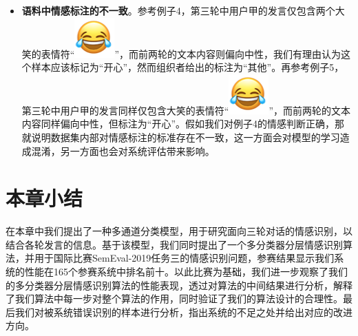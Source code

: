 \begin{itemize}
\item {\bf 语料中情感标注的不一致}。参考例子4，第三轮中用户甲的发言仅包含两个大笑的表情符“\includegraphics[height=1.5\fontcharht\font`\B]{img/emoji/lol.png}”，而前两轮的文本内容则偏向中性，我们有理由认为这个样本应该标记为“开心”，然而组织者给出的标注为“其他”。再参考例子5，第三轮中用户甲的发言同样仅包含大笑的表情符“\includegraphics[height=1.5\fontcharht\font`\B]{img/emoji/lol.png}”，而前两轮的文本内容同样偏向中性，但标注为“开心”。假如我们对例子4的情感判断正确，那就说明数据集内部对情感标注的标准存在不一致，这一方面会对模型的学习造成混淆，另一方面也会对系统评估带来影响。

\end{itemize}

\section{本章小结}

在本章中我们提出了一种多通道分类模型，用于研究面向三轮对话的情感识别，以结合各轮发言的信息。基于该模型，我们同时提出了一个多分类器分层情感识别算法，并用于国际比赛SemEval-2019任务三的情感识别问题，参赛结果显示我们系统的性能在165个参赛系统中排名前十。以此比赛为基础，我们进一步观察了我们的多分类器分层情感识别算法的性能表现，透过对算法的中间结果进行分析，解释了我们算法中每一步对整个算法的作用，同时验证了我们的算法设计的合理性。最后我们对被系统错误识别的样本进行分析，指出系统的不足之处并给出对应的改进方向。


